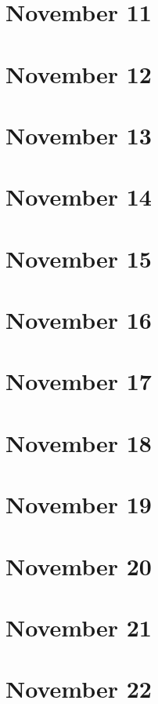 \section{November 11}

\section{November 12}

\section{November 13}

\section{November 14}

\section{November 15}

\section{November 16}

\section{November 17}

\section{November 18}

\section{November 19}

\section{November 20}

\section{November 21}

\section{November 22}

